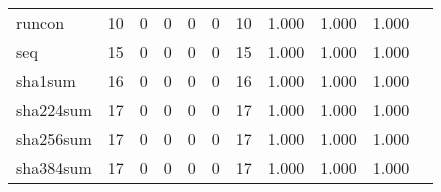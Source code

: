 \begin{longtable}{lp{1.20cm}p{1.20cm}p{1.20cm}p{1.20cm}p{1.20cm}p{1.20cm}p{1.20cm}p{1.20cm}p{1.20cm}p{1.20cm}}
runcon    &                                    10 &                                                  0 &                                                  0 &                                                  0 &                                                  0 &                                                 10 &                                         1.000 &                                              1.000 &                                              1.000 \\
seq       &                                    15 &                                                  0 &                                                  0 &                                                  0 &                                                  0 &                                                 15 &                                         1.000 &                                              1.000 &                                              1.000 \\
sha1sum   &                                    16 &                                                  0 &                                                  0 &                                                  0 &                                                  0 &                                                 16 &                                         1.000 &                                              1.000 &                                              1.000 \\
sha224sum &                                    17 &                                                  0 &                                                  0 &                                                  0 &                                                  0 &                                                 17 &                                         1.000 &                                              1.000 &                                              1.000 \\
sha256sum &                                    17 &                                                  0 &                                                  0 &                                                  0 &                                                  0 &                                                 17 &                                         1.000 &                                              1.000 &                                              1.000 \\
sha384sum &                                    17 &                                                  0 &                                                  0 &                                                  0 &                                                  0 &                                                 17 &                                         1.000 &                                              1.000 &                                              1.000 \\

\end{longtable}
